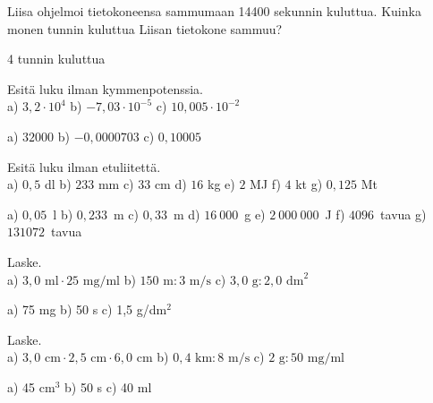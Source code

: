 \begin{tehtavasivu}
\begin{tehtava}
Liisa ohjelmoi tietokoneensa sammumaan 14400 sekunnin kuluttua.
Kuinka monen tunnin kuluttua Liisan tietokone sammuu?
\begin{vastaus}
4 tunnin kuluttua
\end{vastaus}
\end{tehtava}


\begin{tehtava}
Esitä luku ilman kymmenpotenssia. \\
a) $3,2 \cdot 10^4$ \quad
b) $-7,03 \cdot 10^{-5}$ \quad
c) $10,005 \cdot 10^{-2}$ \quad
\begin{vastaus}
a) $32000$ \qquad
b) $-0,0000703$ \qquad
c) $0,10005$ \qquad
\end{vastaus}
\end{tehtava}


\begin{tehtava}
Esitä luku ilman etuliitettä. \\
a) $0,5$ dl \qquad
b) $233$ mm \qquad
c) $33$ cm \qquad
d) $16$ kg \qquad
e) $2$ MJ \qquad
f) $4$ kt \qquad
g) $0,125$ Mt
\begin{vastaus}
a) $0,05$~l \qquad
b) $0,233$~m \qquad
c) $0,33$~m \qquad
d) $16~000$~g \qquad
e) $2~000~000$~J \qquad
f) $4096$~tavua \qquad
g) $131072$~tavua
\end{vastaus}
\end{tehtava}


\begin{tehtava}
Laske. \\
a) $3,0 \textrm{ ml} \cdot 25 \textrm{ mg/ml}$ \qquad
b) $150 \textrm{ m} : 3 \textrm{ m/s}$ \qquad
c) $3,0 \textrm{ g} : 2,0 \textrm{ dm}^2$
\begin{vastaus}
a) 75 mg \qquad
b) 50 s \qquad
c) 1,5 g/dm$^2$
\end{vastaus}
\end{tehtava}

\begin{tehtava}
Laske. \\
a) $3,0 \textrm{ cm} \cdot 2,5 \textrm{ cm} \cdot 6,0 \textrm{ cm}$ \qquad
b) $0,4 \textrm{ km} : 8 \textrm{ m/s}$ \qquad
c) $2 \textrm{ g} : 50 \textrm{ mg/ml}$
\begin{vastaus}
a) 45 cm$^3$ \qquad
b) 50 s \qquad
c) 40 ml
\end{vastaus}
\end{tehtava}


\end{tehtavasivu}
